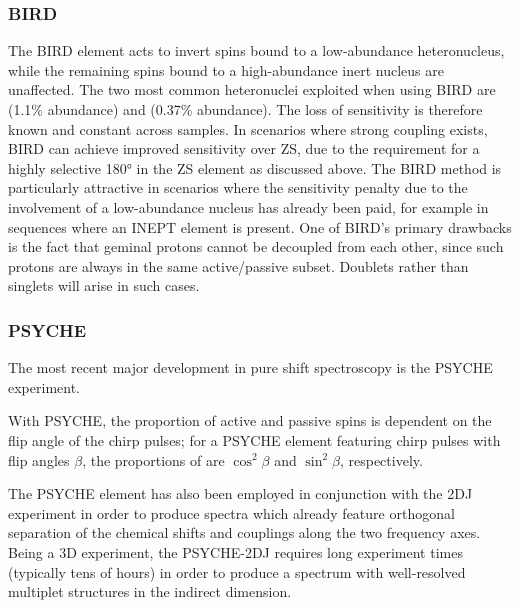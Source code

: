 \subsubsection{\Ac{BIRD}}
The \ac{BIRD} element acts to invert spins bound to a low-abundance
heteronucleus, while the remaining spins bound to a high-abundance inert nucleus are
unaffected\cite{Garbow1982,Bax1983}.
The two most common heteronuclei exploited when using \ac{BIRD} are 
(1.1\% abundance) and  (0.37\% abundance). The loss of sensitivity
is therefore known and constant across samples. In scenarios where strong
coupling exists, \ac{BIRD} can achieve improved sensitivity over \ac{ZS}, due
to the requirement for a highly selective \ang{180} in the \ac{ZS} element as
discussed above.
The \ac{BIRD} method is particularly attractive in scenarios where the
sensitivity penalty due to the involvement of a low-abundance nucleus has
already been paid, for example in sequences where an \ac{INEPT} element is
present\cite{Paudel2013}. One of \ac{BIRD}'s primary drawbacks is the fact that
geminal protons cannot be decoupled from each other, since such protons are
always in the same active/passive subset. Doublets rather than singlets will
arise in such cases.

\subsubsection{\Ac{PSYCHE}}
\label{subsec:psyche}
The most recent major development in pure shift spectroscopy is the \ac{PSYCHE}
experiment\cite{Foroozandeh2014,Foroozandeh2018}.

With \ac{PSYCHE}, the proportion of active and passive spins is
dependent on the flip angle of the chirp pulses; for a
\ac{PSYCHE} element featuring chirp pulses with flip angles $\beta$, the
proportions of are $\cos^2 \beta$ and $\sin^2 \beta$, respectively.

The \ac{PSYCHE} element has also been employed in conjunction with the \ac{2DJ}
experiment in order to produce spectra which already feature orthogonal
separation of the chemical shifts and couplings along the two frequency
axes\cite{Foroozandeh2015,Kiraly2017}. Being a 3D experiment, the
\ac{PSYCHE}-\ac{2DJ} requires long experiment times (typically tens of hours)
in order to produce a spectrum with well-resolved multiplet structures in the
indirect dimension.
